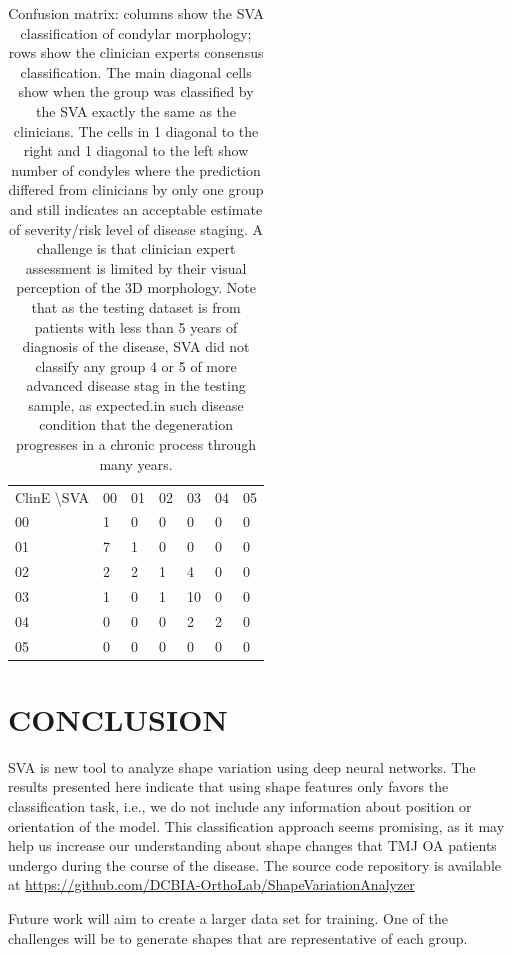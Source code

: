 \documentclass[]{spie}  %
\begin{document}
\begin{table}[]
\centering
\caption{Confusion matrix: columns show the SVA classification of condylar morphology; rows show the clinician experts consensus classification. The main diagonal cells show when the group was classified by the SVA exactly the same as the clinicians. The cells in 1 diagonal to the right and 1 diagonal to the left show number of condyles where the prediction differed from clinicians by only one group and still indicates an acceptable estimate of severity/risk level of disease staging. A challenge is that clinician expert assessment is limited by their visual perception of the 3D morphology. Note that as the testing dataset is from patients with less than 5 years of  diagnosis of the disease, SVA  did not classify any  group 4 or  5 of  more  advanced disease stag in the testing sample, as expected.in such disease  condition that  the degeneration progresses in a chronic process through many years. }
\label{tab:confusion}
\begin{tabular}{lllllll}
ClinE \textbackslash  SVA & 00 & 01 & 02 & 03  & 04 & 05 \\
00                       & 1 & 0 & 0 & 0  & 0 & 0 \\
01                       & 7 & 1 & 0 & 0  & 0 & 0 \\
02                       & 2 & 2 & 1 & 4  & 0 & 0 \\
03                       & 1 & 0 & 1 & 10 & 0 & 0 \\
04                       & 0 & 0 & 0 & 2  & 2 & 0 \\
05                       & 0 & 0 & 0 & 0  & 0 & 0
\end{tabular}
\end{table}

\section{CONCLUSION}

SVA is new tool to analyze shape variation using deep neural networks. 
The results presented here indicate that using shape features only favors the classification task, i.e., 
we do not include any information about position or orientation of the model. 
This classification approach seems promising, as it may help us increase our understanding about 
shape changes that TMJ OA patients undergo during the course of the disease. 
The source code repository is available at \url{https://github.com/DCBIA-OrthoLab/ShapeVariationAnalyzer}

Future work will aim to create a larger data set for training. 
One of the challenges will be to generate shapes that are representative of each group. 


\end{document}
